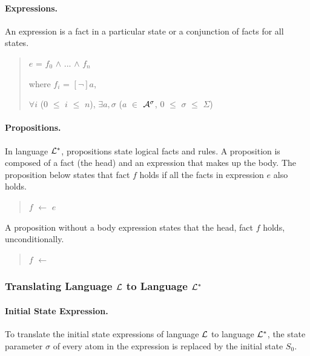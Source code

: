 \documentclass[10pt, twocolumn]{article}
\begin{document}
        \paragraph{Expressions.}

          An expression is a fact in a particular state or a conjunction of
          facts for all states.

          \begin{quote}
            $e$ = $f_{0}$ $\land$ ... $\land$ $f_{n}$

            where $f_{i}$ = $[\lnot]$$a$,

            $\forall$$i$ ($0$ $\leq$ $i$ $\leq$ $n$),
            $\exists$$a,\sigma$ ($a$ $\in$ ${\cal A}^{\sigma}$, $0$ $\leq$ $\sigma$ $\leq$ $\Sigma$)
          \end{quote}

        \paragraph{Propositions.}

          In language ${\cal L}^{*}$, propositions state logical facts and
          rules. A proposition is composed of a fact (the head) and an
          expression that makes up the body. The proposition below states that
          fact $f$ holds if all the facts in expression $e$ also holds.

          \begin{quote}
            $f$ $\leftarrow$ $e$
          \end{quote}

          A proposition without a body expression states that the head, fact
          $f$ holds, unconditionally.

          \begin{quote}
            $f$ $\leftarrow$
          \end{quote}

      \subsubsection{Translating Language ${\cal L}$ to Language ${\cal L^{*}}$}

        \paragraph{Initial State Expression.}

          To translate the initial state expressions of language ${\cal L}$ to
          language ${\cal L}^{*}$, the state parameter $\sigma$ of every atom
          in the expression is replaced by the initial state $S_{0}$.
\end{document}
